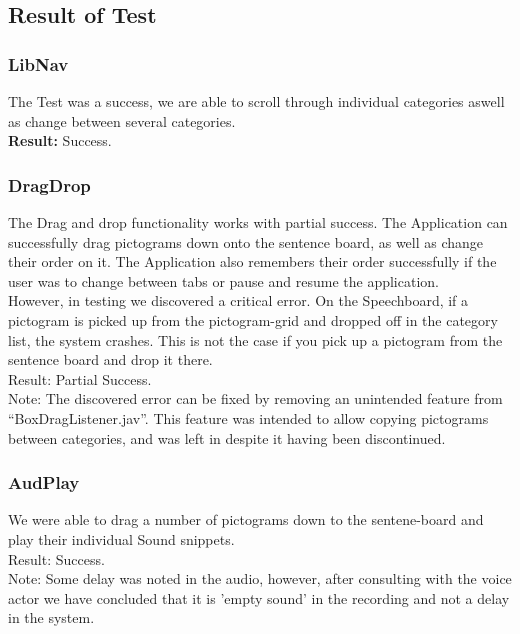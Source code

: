 \subsection{Result of Test}
\subsubsection*{LibNav}
The Test was a success, we are able to scroll through individual categories aswell as change between several categories.\\

\textbf{Result:} Success.

\subsubsection*{DragDrop}
The Drag and drop functionality works with partial success.
The Application can successfully drag pictograms down onto the sentence board, as well as change their order on it.
The Application also remembers their order successfully if the user was to change between tabs or pause and resume the application.\\

However, in testing we discovered a critical error. On the Speechboard, if a pictogram is picked up from the pictogram-grid and dropped off in the category list, the system crashes.
This is not the case if you pick up a pictogram from the sentence board and drop it there.\\

Result: Partial Success.\\

Note: The discovered error can be fixed by removing an unintended feature from ``BoxDragListener.jav''. This feature was intended to allow copying pictograms between categories, and was left in despite it having been discontinued. 

\subsubsection*{AudPlay}
We were able to drag a number of pictograms down to the sentene-board and play their individual Sound snippets.\\

Result: Success.\\

Note: Some delay was noted in the audio, however, after consulting with the voice actor we have concluded that it is 'empty sound' in the recording and not a delay in the system.

